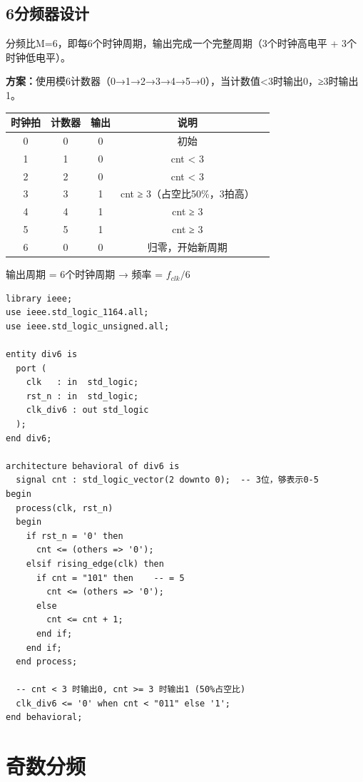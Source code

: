 \subsection{6分频器设计}

分频比M=6，即每6个时钟周期，输出完成一个完整周期（3个时钟高电平 + 3个时钟低电平）。

\textbf{方案：}使用模6计数器（0→1→2→3→4→5→0），当计数值<3时输出0，≥3时输出1。

\begin{beatanalysis}[6分频器逐拍分析]
\begin{center}
\begin{tabular}{|c|c|c|c|c|}
\hline
\textbf{时钟拍} & \textbf{计数器} & \textbf{输出} & \textbf{说明} \\
\hline
0 & 0 & 0 & 初始 \\
1 & 1 & 0 & cnt < 3 \\
2 & 2 & 0 & cnt < 3 \\
3 & 3 & 1 & cnt ≥ 3（占空比50\%，3拍高） \\
4 & 4 & 1 & cnt ≥ 3 \\
5 & 5 & 1 & cnt ≥ 3 \\
6 & 0 & 0 & 归零，开始新周期 \\
\hline
\end{tabular}

输出周期 = 6个时钟周期 → 频率 = $f_{clk} / 6$
\end{center}
\end{beatanalysis}

\begin{lstlisting}[caption={6分频器VHDL实现}]
library ieee;
use ieee.std_logic_1164.all;
use ieee.std_logic_unsigned.all;

entity div6 is
  port (
    clk   : in  std_logic;
    rst_n : in  std_logic;
    clk_div6 : out std_logic
  );
end div6;

architecture behavioral of div6 is
  signal cnt : std_logic_vector(2 downto 0);  -- 3位，够表示0-5
begin
  process(clk, rst_n)
  begin
    if rst_n = '0' then
      cnt <= (others => '0');
    elsif rising_edge(clk) then
      if cnt = "101" then    -- = 5
        cnt <= (others => '0');
      else
        cnt <= cnt + 1;
      end if;
    end if;
  end process;

  -- cnt < 3 时输出0, cnt >= 3 时输出1 (50%占空比)
  clk_div6 <= '0' when cnt < "011" else '1';
end behavioral;
\end{lstlisting}

\section{奇数分频}


